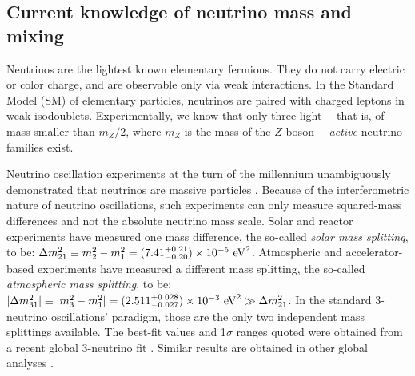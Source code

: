\subsection{\label{subsec:massivenus_whereweare}Current knowledge of neutrino mass and mixing}
%
Neutrinos are the lightest known elementary fermions. They do not carry electric or color charge, and are observable only via weak interactions. In the Standard Model (SM) of elementary particles, neutrinos are paired with charged leptons in weak isodoublets. Experimentally, we know that only three light ---\thinspace that is, of mass smaller than $m_Z/2$, where $m_Z$ is the mass of the $Z$ boson\thinspace--- \emph{active} neutrino families exist.

Neutrino oscillation experiments at the turn of the millennium unambiguously demonstrated that neutrinos are massive particles \cite{Super-Kamiokande:1998kpq,SNO:2001kpb,SNO:2002tuh}. Because of the interferometric nature of neutrino oscillations, such experiments can only measure squared-mass differences and not the absolute neutrino mass scale. Solar and reactor experiments have measured one mass difference, the so-called \emph{solar mass splitting}, to be: $\Delta m^2_{21}\equiv m^2_2-m^2_1= (7.41^{+0.21}_{-0.20})\times 10^{-5}\ {\rm eV}^2$. Atmospheric and accelerator-based experiments have measured a different mass splitting, the so-called \emph{atmospheric mass splitting}, to be: $\lvert\Delta m^2_{\rm 31}\rvert\equiv \lvert m^2_3-m^2_1\rvert= (2.511^{+0.028}_{-0.027})\times 10^{-3}\ {\rm eV}^2\gg \Delta m^2_{21}$. In the standard 3-neutrino oscillations' paradigm, those are the only two independent mass splittings available. The best-fit values and 1$\sigma$ ranges quoted were obtained from a recent global 3-neutrino fit \cite{Esteban:2020cvm}. Similar results are obtained in other global analyses \cite{deSalas:2020pgw,Capozzi:2021fjo}.

